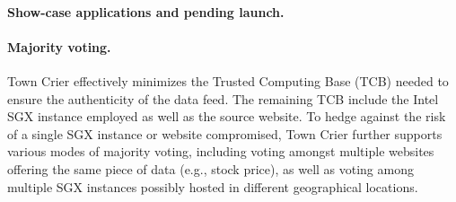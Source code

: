 \paragraph{Show-case applications and pending launch.}



\paragraph{Majority voting.}
Town Crier effectively minimizes the 
Trusted Computing Base (TCB) needed to ensure
the authenticity of the data feed.
The remaining TCB include the Intel SGX 
instance employed as well as the source website. 
To hedge against the risk of a single SGX instance
or website compromised, Town Crier further supports 
various modes of majority voting,  
including voting amongst multiple 
websites offering the same piece of data (e.g., stock price),  
as well as voting among multiple SGX instances possibly
hosted in different geographical locations.






